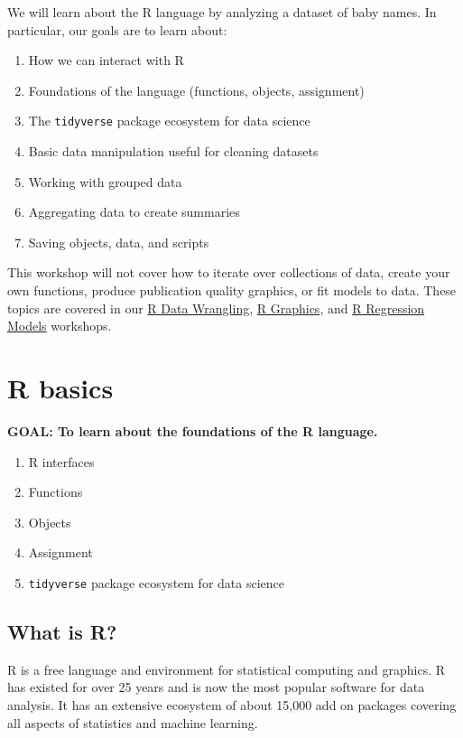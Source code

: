 \documentclass[]{book}
\providecommand{\tightlist}{%
  \setlength{\itemsep}{0pt}\setlength{\parskip}{0pt}}
\begin{document}
We will learn about the R language by analyzing a dataset of baby names.
In particular, our goals are to learn about:

\begin{enumerate}
\def\labelenumi{\arabic{enumi}.}
\tightlist
\item
  How we can interact with R
\item
  Foundations of the language (functions, objects, assignment)
\item
  The \texttt{tidyverse} package ecosystem for data science
\item
  Basic data manipulation useful for cleaning datasets
\item
  Working with grouped data
\item
  Aggregating data to create summaries
\item
  Saving objects, data, and scripts
\end{enumerate}

This workshop will not cover how to iterate over collections of data, create
your own functions, produce publication quality graphics, or fit models to data.
These topics are covered in our \href{./RDataWrangling.html}{R Data Wrangling},
\href{./Rgraphics.html}{R Graphics}, and \href{./Rmodels.html}{R Regression Models} workshops.

\hypertarget{r-basics}{%
\section{R basics}\label{r-basics}}

\textbf{GOAL: To learn about the foundations of the R language.}

\begin{enumerate}
\def\labelenumi{\arabic{enumi}.}
\tightlist
\item
  R interfaces
\item
  Functions
\item
  Objects
\item
  Assignment
\item
  \texttt{tidyverse} package ecosystem for data science
\end{enumerate}

\hypertarget{what-is-r}{%
\subsection{What is R?}\label{what-is-r}}

R is a free language and environment for statistical computing and graphics.
R has existed for over 25 years and is now the most popular software for
data analysis. It has an extensive ecosystem of about 15,000 add on packages
covering all aspects of statistics and machine learning.
\end{document}

